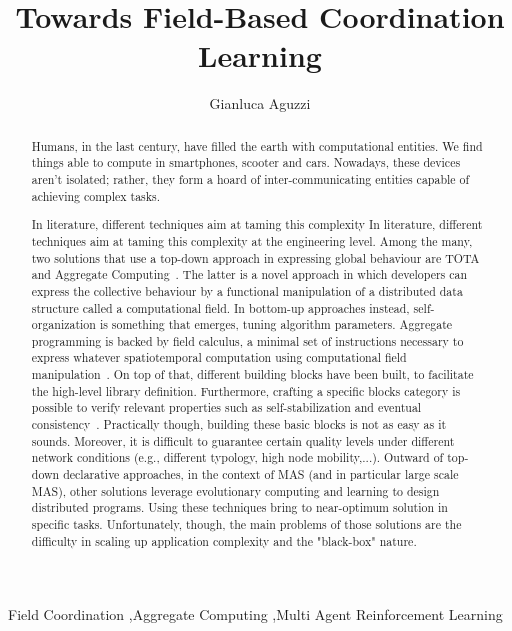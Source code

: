 \documentclass[3p]{elsarticle}
\begin{document}
\begin{frontmatter}

\title{Towards Field-Based Coordination Learning} %


\author{Gianluca Aguzzi}
\address{\texttt{gianluca.aguzzi@unibo.it}}
\begin{abstract}
Humans, in the last century, have filled the earth with computational entities. 
%
We find things able to compute in smartphones, scooter and cars. %
Nowadays, these devices aren't isolated; rather, they form a hoard of inter-communicating entities capable of achieving complex tasks.

In literature, different techniques aim at taming this complexity In literature, different techniques aim at taming this complexity at the engineering level.
%
Among the many, two solutions that use a top-down approach in expressing global behaviour are TOTA~\cite{DBLP:journals/tosem/MameiZ09} and Aggregate Computing~\cite{DBLP:journals/computer/BealPV15}.
%
The latter is a novel approach in which developers can express the collective behaviour by 
a functional manipulation of a distributed data structure called a computational field.
%
In bottom-up approaches instead, self-organization is something that emerges, tuning algorithm parameters.
%
Aggregate programming is backed by field calculus, a minimal set of instructions necessary to express whatever spatiotemporal computation using computational field manipulation~\cite{DBLP:conf/coordination/AudritoBDV18}. 
%
On top of that, different building blocks have been built, to facilitate the high-level library definition.
%
Furthermore, crafting a specific blocks category is possible to verify relevant properties such as self-stabilization \cite{DBLP:conf/coordination/ViroliD14} and eventual consistency~\cite{DBLP:conf/saso/BealVPD16}.
%
Practically though, building these basic blocks is not as easy as it sounds. Moreover, it is difficult to guarantee certain quality levels under different network conditions (e.g., different typology, high node mobility,...).
%
Outward of top-down declarative approaches, in the context of MAS (and in particular large scale MAS), other solutions leverage evolutionary computing and learning to design distributed programs. Using these techniques bring to near-optimum solution in specific tasks. 
%
Unfortunately, though, the main problems of those solutions are the difficulty in scaling up application complexity and the "black-box" nature.
%
\end{abstract}
\begin{keyword}
Field Coordination \sep Aggregate Computing \sep Multi Agent Reinforcement Learning
\end{keyword}

\end{frontmatter}


\end{document}
